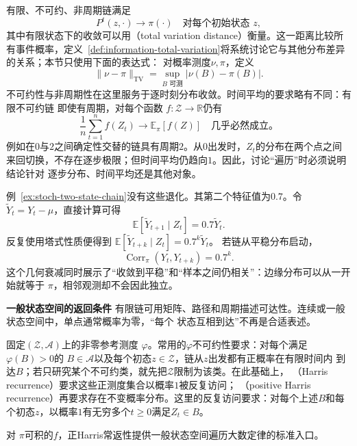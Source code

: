 有限、不可约、非周期链满足
\begin{equation}
  P^t(z,\cdot)\longrightarrow\pi(\cdot)
  \quad\text{对每个初始状态 }z,
  \label{eq:stoch-finite-chain-distribution-convergence}
\end{equation}
其中有限状态下的收敛可以用（total variation distance）衡量。这一距离比较所有事件概率，定义~\ref{def:information-total-variation}将系统讨论它与其他分布差异的关系；本节只使用下面的表达式：
对概率测度$\nu,\pi$，定义
\[
  \lVert\nu-\pi\rVert_{\mathrm{TV}}
  =
  \sup_{B\text{ 可测}}|\nu(B)-\pi(B)|.
\]
不可约性与非周期性在这里服务于逐时刻分布收敛。时间平均的要求略有不同：有限不可约链
即使有周期，对每个函数
$f:\mathcal{Z}\to\mathbb{R}$仍有
\begin{equation}
  \frac1n\sum_{t=1}^{n}f(Z_t)\longrightarrow\mathbb{E}_{\pi}[f(Z)]
  \quad\text{几乎必然成立。}
  \label{eq:stoch-markov-ergodic-average}
\end{equation}
例如在$0$与$2$之间确定性交替的链具有周期$2$。从$0$出发时，$Z_t$的分布在两个点之间
来回切换，不存在逐步极限；但时间平均仍趋向$1$。因此，讨论“遍历”时必须说明结论针对
逐步分布、时间平均还是其他对象。

例~\ref{ex:stoch-two-state-chain}没有这些退化。其第二个特征值为$0.7$。令
$\widetilde{Y}_t=Y_t-\mu$，直接计算可得
\begin{equation}
  \mathbb{E}[\widetilde{Y}_{t+1}\mid Z_t]=0.7\widetilde{Y}_t.
  \label{eq:stoch-two-state-eigenfunction}
\end{equation}
反复使用塔式性质便得到
$\mathbb{E}[\widetilde{Y}_{t+k}\mid Z_t]=0.7^k\widetilde{Y}_t$。
若链从平稳分布启动，
\begin{equation}
  \operatorname{Corr}_{\pi}(Y_t,Y_{t+k})=0.7^k.
  \label{eq:stoch-two-state-autocorrelation}
\end{equation}
这个几何衰减同时展示了“收敛到平稳”和“样本之间仍相关”：边缘分布可以从一开始就等于
$\pi$，相邻观测却不会因此独立。

\par\medskip\noindent\textbf{一般状态空间的返回条件}\quad
有限链可用矩阵、路径和周期描述可达性。连续或一般状态空间中，单点通常概率为零，“每个
状态互相到达”不再是合适表述。
\begin{definition}[一般状态空间的不可约性与Harris常返性]
  \label{def:stoch-harris-recurrence}
固定$(\mathcal{Z},\mathcal{A})$上的非零参考测度
$\varphi$。常用的$\varphi$不可约性要求：对每个满足$\varphi(B)>0$的
$B\in\mathcal{A}$以及每个初态$z\in\mathcal{Z}$，链从$z$出发都有正概率在有限时间内
到达$B$；若只研究某个不可约类，就先把$\mathcal{Z}$限制为该类。在此基础上，
（Harris recurrence）要求这些正测度集合以概率$1$被反复访问；
（positive Harris recurrence）再要求存在不变概率分布。这里的反复访问要求：对每个上述\(B\)和每个初态\(z\)，以概率\(1\)有无穷多个\(t\geq0\)满足\(Z_t\in B\)。
\end{definition}
对
$\pi$可积的$f$，正Harris常返性提供一般状态空间遍历大数定律的标准入口。


